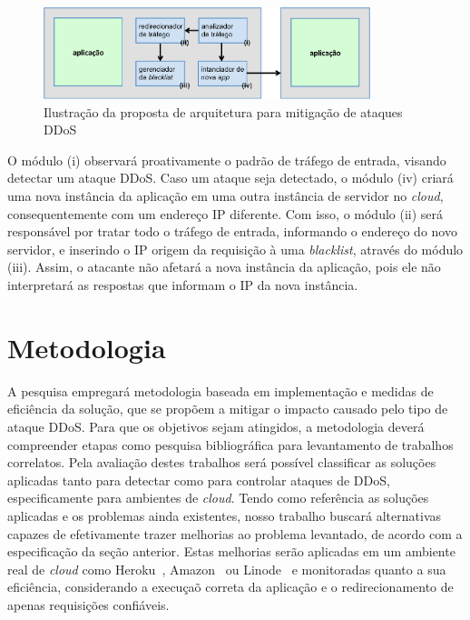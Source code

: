 \documentclass[a4paper, 11pt]{article}
\begin{document}
\begin{figure}[h!]
\centering
\includegraphics[width=0.85\textwidth]{arquitetura.eps}
\caption{Ilustração da proposta de arquitetura para mitigação de ataques DDoS}
\label{fig:arq}
\end{figure}


O módulo (i) observará proativamente o padrão de tráfego de entrada, visando
detectar um ataque DDoS. Caso um ataque seja detectado, o m\'odulo (iv) criará
uma nova
instância da aplicação em uma outra instância de servidor no \emph{cloud},
consequentemente com um endereço IP diferente.
Com isso, o módulo (ii) será responsável por tratar todo o tráfego de
entrada, informando o endereço do novo servidor, e inserindo o IP origem da
requisição à uma \emph{blacklist}, através do módulo (iii). Assim, o
atacante não afetará a nova instância da aplicação, pois ele não interpretará as
respostas que informam o IP da nova instância.


\section{Metodologia}
A pesquisa empregar\'a metodologia baseada em implementa\c{c}\~{a}o e medidas de
efici\^encia da solu\c{c}\~{a}o, que se propõem a mitigar o impacto causado pelo
tipo de ataque DDoS. Para que os objetivos sejam atingidos, a metodologia
dever\'a
compreender etapas como pesquisa bibliogr\'afica para levantamento de trabalhos
correlatos. Pela avalia\c{c}\~{a}o destes trabalhos ser\'a poss\'ivel
classificar as
solu\c{c}\~oes aplicadas tanto para detectar como para controlar ataques de
DDoS,
especificamente para ambientes de \emph{cloud}. Tendo como refer\^encia as
solu\c{c}\~oes aplicadas e os problemas ainda existentes, nosso trabalho
buscar\'a
alternativas capazes de efetivamente trazer melhorias ao problema levantado,
de acordo com a especificação da seção anterior.
Estas melhorias ser\~ao aplicadas em um ambiente real de \emph{cloud} como
Heroku~\cite{heroku}, Amazon~\cite{amazon}
ou Linode~\cite{linode} e monitoradas quanto a sua efici\^encia, considerando a
execu\c{c}a\~o correta da aplica\c{c}\~{a}o e o redirecionamento de apenas
requisições
confi\'aveis.
\end{document}
